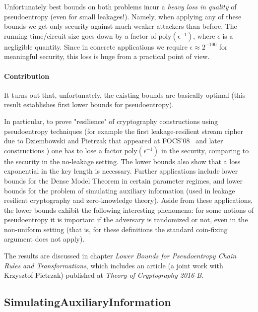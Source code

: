 \documentclass[12pt]{report}
\begin{document}
Unfortunately best bounds on both problems incur a \emph{heavy loss in quality} of pseudoentropy (even for small leakages!). Namely, when applying any of these bounds we get only security against much weaker attackers than before.
The running time/circuit size goes down by a factor of $\mathrm{poly(\epsilon^{-1})}$, where $\epsilon$ is a negligible quantity. Since in concrete applications we require $\epsilon \approx 2^{-100}$ for 
meaningful security, this loss is huge from a practical point of view.

\paragraph{Contribution}

It turns out that, unfortunately, the existing bounds are basically optimal (this result establishes
first lower bounds for pseudoentropy).

In particular, to prove "resilience" of cryptography constructions using pseudoentropy techniques (for example 
the first leakage-resilient stream cipher due to Dziembowski and Pietrzak that appeared at FOCS'08~\cite{DBLP:conf/focs/DziembowskiP08} and later constructions \cite{DBLP:conf/eurocrypt/Pietrzak09,DBLP:conf/tcc/JetchevP14}) one has to lose a factor $\mathrm{poly(\epsilon^{-1})}$ in the security, comparing to the security in the no-leakage setting. The lower bounds
also show that a loss exponential in the key length is necessary. Further applications include lower bounds for the Dense Model Theorem in certain parameter regimes, and lower bounds for the problem of simulating auxiliary information (used in leakage resilient cryptography and zero-knowledge theory). Aside from these applications, the lower bounds exhibit the following interesting phenomena: for some notions of pseudoentropy it is important if the adversary is randomized or not, even in the non-uniform setting (that is, for these definitions the standard coin-fixing argument does not apply).

The results are discussed in chapter \emph{Lower Bounds for Pseudoentropy Chain Rules and Transformations}, which includes
an article (a joint work with Krzysztof Pietrzak) published at \emph{Theory of Cryptography 2016-B}.



\subsection{SimulatingAuxiliaryInformation}
\end{document}
